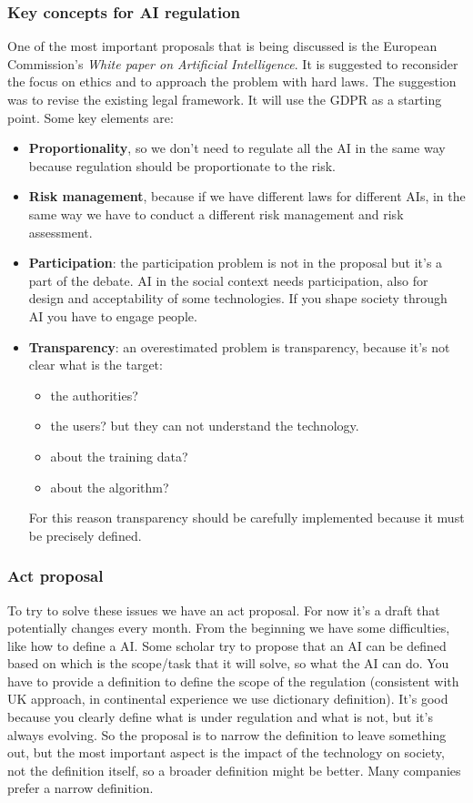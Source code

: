 \subsubsection{Key concepts for AI regulation}
One of the most important proposals that is being discussed is the European Commission's \textit{White paper on Artificial Intelligence}. It is suggested to reconsider the focus on ethics and to approach the problem with hard laws. The suggestion was to revise the existing legal framework. It will use the GDPR as a starting point.
Some key elements are: 
\begin{itemize}
    \item \textbf{Proportionality}, so we don't need to regulate all the AI in the same way because regulation should be proportionate to the risk.
    \item \textbf{Risk management}, because if we have different laws for different AIs, in the same way we have to conduct a different risk management and risk assessment.
    \item \textbf{Participation}: the participation problem is not in the proposal but it's a part of the debate. AI in the social context needs participation, also for design and acceptability of some technologies. If you shape society through AI you have to engage people.
    \item \textbf{Transparency}: an overestimated problem is transparency, because it's not clear what is the target:
    \begin{itemize}
        \item the authorities?
        \item the users? but they can not understand the technology.
        \item about the training data?
        \item about the algorithm?
    \end{itemize}
    For this reason transparency should be carefully implemented because it must be precisely defined.
\end{itemize}

\subsubsection{Act proposal}
To try to solve these issues we have an act proposal. For now it's a draft that potentially changes every month. From the beginning we have some difficulties, like how to define a AI. Some scholar try to propose that an AI can be defined based on which is the scope/task that it will solve, so what the AI can do. You have to provide a definition to define the scope of the regulation (consistent with UK approach, in continental experience we use dictionary definition). It's good because you clearly define what is under regulation and what is not, but it's always evolving. So the proposal is to narrow the definition to leave something out, but the most important aspect is the impact of the technology on society, not the definition itself, so a broader definition might be better. Many companies prefer a narrow definition.


